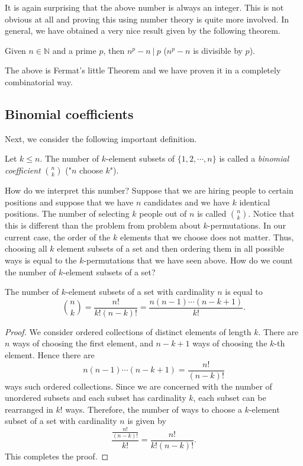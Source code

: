 It is again surprising that the above number is always an integer. This is not obvious at all and proving this using number theory is quite more involved. In general, we have obtained a very nice result given by the following theorem.

\begin{theorem}
Given $n \in \mathbb{N}$ and a prime $p$, then $n^p -n\ |\ p$ ($n^p - n$ is divisible by $p$).  
\end{theorem}
\noindent
The above is Fermat's little Theorem and we have proven it in a completely combinatorial way.

\subsection{Binomial coefficients}

Next, we consider the following important definition.

\begin{defn}
Let $k \leq n$. The number of $k$-element subsets of $\{1, 2, \cdots, n\}$ is called a \textit{binomial coefficient} ${n \choose k}$ ("$n$ choose $k$").
\end{defn}

How do we interpret this number? Suppose that we are hiring people to certain positions and suppose that we have $n$ candidates and we have $k$ identical positions.
The number of selecting $k$ people out of $n$ is called ${n \choose k}$. Notice that this is different than the problem from problem about $k$-permutations.
In our current case, the order of the $k$ elements that we choose does not matter. Thus, choosing all $k$ element subsets of a set and then ordering them in all possible ways
is equal to the $k$-permutations that we have seen above. How do we count the number of $k$-element subsets of a set?

\begin{theorem}
The number of $k$-element subsets of a set with cardinality $n$ is equal to 
$$
{n \choose k}=\frac{n!}{k!(n-k)!}=\frac{n(n-1)\cdots (n-k+1)}{k!}.
$$
\label{thmBinomial}
\end{theorem}

\begin{proof}
We consider ordered collections of distinct elements of length $k$. There are $n$ ways of choosing the first element, and $n-k+1$ ways of choosing the $k$-th element.
Hence there are 
$$
n(n-1)\cdots (n-k+1)=\frac{n!}{(n-k)!}
$$
ways such ordered collections. Since we are concerned with the number of unordered subsets and each subset has cardinality $k$, each subset can be rearranged in $k!$ ways.
Therefore, the number of ways to choose a $k$-element subset of a set with cardinality $n$ is given by 
$$
\frac{\frac{n!}{(n-k)!}}{k!}=\frac{n!}{k!(n-k)!}.
$$
This completes the proof.
\end{proof}

